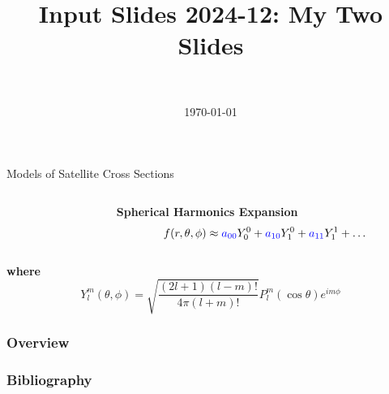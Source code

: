 \documentclass[]{beamer}
\title[Input Slides 2024-12]{Input Slides 2024-12: My Two Slides}
\author[Daniel Topa]{\TopaHII \\ \TopaHIIEmail}
\institute{\missiontech}
\date{\today}
\begin{document}
\begin{frame}
	\titlepage
\end{frame}

\begin{frame}{Models of Satellite Cross Sections}
    \centering
    \begin{columns}[c,onlytextwidth]
        \begin{column}{0.4\textwidth}
            \centering
        \end{column}

        \begin{column}{0.6\textwidth}
            \centering
            \textbf{\large Spherical Harmonics Expansion} \\[1em]
            \[
            f(r, \theta, \phi) \approx 
            \textcolor{blue}{a_{00}} Y_0^0 + \textcolor{blue}{a_{10}} Y_1^0 + \textcolor{blue}{a_{11}} Y_1^1 + \dots
            \]
        \end{column}
    \end{columns}

    \vspace{1em}
    \textbf{where}
    \[
    Y_l^m (\theta, \phi) = \sqrt{\frac{(2l+1)(l-m)!}{4\pi (l+m)!}} P_l^m (\cos \theta) e^{i m \phi}
    \]
\end{frame}

\begin{frame}\frametitle{Overview}
	\tableofcontents[hideallsubsections]
\end{frame}

	
	
	

{\tiny{
\begin{frame}[allowframebreaks]\frametitle{Bibliography}
	\nocite{*}
	\printbibliography
\end{frame}}}

\begin{frame}
	\titlepage
\end{frame}
\end{document}
